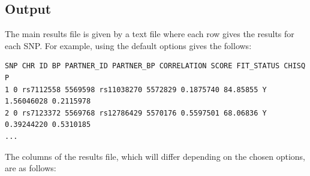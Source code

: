 \documentclass[a4paper,12pt]{article}
\begin{document}
\subsection{Output}
\label{output}

The main results file is given by a text file where each row gives the results for each SNP. For example, using the default options gives the follows: 
\begin{verbatim}
SNP CHR ID BP PARTNER_ID PARTNER_BP CORRELATION SCORE FIT_STATUS CHISQ P
1 0 rs7112558 5569598 rs11038270 5572829 0.1875740 84.85855 Y 1.56046028 0.2115978
2 0 rs7123372 5569768 rs12786429 5570176 0.5597501 68.06836 Y 0.39244220 0.5310185
...
\end{verbatim}

The columns of the results file, which will differ depending on the chosen options, are as follows: 
\end{document}
